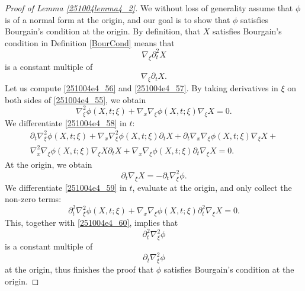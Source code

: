 \documentclass{article}
\numberwithin{equation}{section}
\theoremstyle{plain}
\begin{document}
\begin{proof}[Proof of Lemma \ref{251004lemma4_2}]
We without loss of generality assume that $\phi$ is of a normal form at the origin, and our goal is to show that $\phi$ satisfies Bourgain's condition at the origin. By definition, that $X$ satisfies Bourgain's condition in Definition \ref{BourCond} means that 
\begin{equation}\label{251004e4_56}
\nabla_{\xi} \partial_t^2 X
\end{equation}
is a constant multiple of 
\begin{equation}\label{251004e4_57}
\nabla_{\xi} \partial_t X.
\end{equation}
Let us compute  \eqref{251004e4_56} and \eqref{251004e4_57}. By taking derivatives in $\xi$ on both sides of \eqref{251004e4_55}, we obtain 
\begin{equation}\label{251004e4_58}
\nabla^2_{\xi} \phi(X, t; \xi)+
\nabla_x 
 \nabla_{\xi} \phi(X, t; \xi) \nabla_{\xi} X= 0.
\end{equation}
We differentiate \eqref{251004e4_58} in $t$: 
\begin{multline}\label{251004e4_59}
\partial_t \nabla^2_{\xi} \phi(X, t; \xi)
+
\nabla_x \nabla^2_{\xi} \phi(X, t; \xi) \partial_t X
+
\partial_t \nabla_x 
 \nabla_{\xi} \phi(X, t; \xi) \nabla_{\xi} X
 +\\
 \nabla^2_x 
 \nabla_{\xi} \phi(X, t; \xi) \nabla_{\xi} X \partial_t X+
 \nabla_x 
 \nabla_{\xi} \phi(X, t; \xi) \partial_t \nabla_{\xi} X
 = 0.
\end{multline}
At the origin, we obtain 
\begin{equation}\label{251004e4_60}
\partial_t\nabla_{\xi}X= -\partial_t \nabla^2_{\xi} \phi.
\end{equation}
We differentiate \eqref{251004e4_59} in $t$, evaluate at the origin, and only collect the non-zero terms:
\begin{equation}
\partial^2_t \nabla^2_{\xi} \phi(X, t; \xi)+  \nabla_x 
 \nabla_{\xi} \phi(X, t; \xi) \partial^2_t \nabla_{\xi} X=0.
\end{equation}
This, together with \eqref{251004e4_60}, implies that 
\begin{equation}
\partial^2_t \nabla^2_{\xi} \phi
\end{equation}
is a constant multiple of 
\begin{equation}
\partial_t \nabla^2_{\xi} \phi
\end{equation}
at the origin, thus finishes the proof that $\phi$ satisfies Bourgain's condition at the origin. 
\end{proof}
\end{document}
